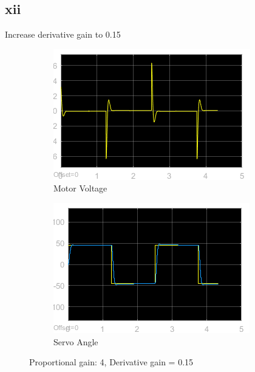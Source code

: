 \documentclass[12pt]{article}
\begin{document}
\subsection*{xii} %
Increase derivative gain to 0.15
\begin{figure}[h!]
    \centering
    \begin{subfigure}[b]{0.49\textwidth}
        \includegraphics[width=\textwidth]{xii_voltage}
        \caption{Motor Voltage}     
    \end{subfigure}
    \begin{subfigure}[b]{0.49\textwidth}
        \includegraphics[width=\textwidth]{xii_angle}
        \caption{Servo Angle}
    \end{subfigure}
    \caption{\label{fig:xii} Proportional gain: 4, Derivative gain = 0.15}
\end{figure}
\end{document}
